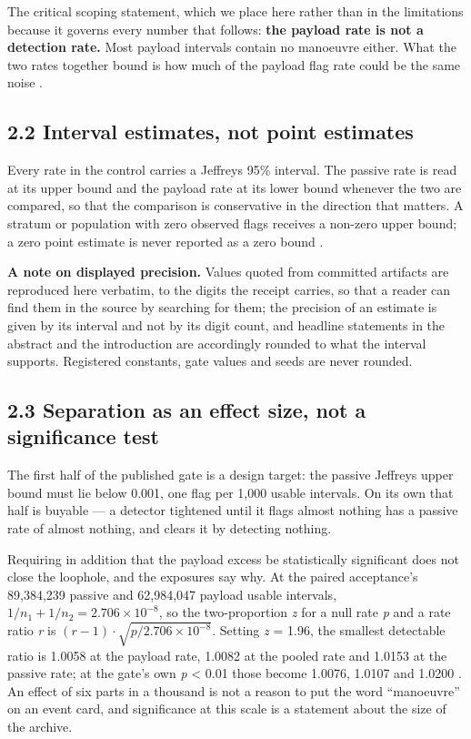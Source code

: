 \documentclass[11pt]{article}
\begin{document}
The critical scoping statement, which we place here rather than in the limitations because it governs every number that follows: \textbf{the payload rate is not a detection rate.} Most payload intervals contain no manoeuvre either. What the two rates together bound is how much of the payload flag rate could be the same noise%
.

\subsection*{2.2 Interval estimates, not point estimates}

Every rate in the control carries a Jeffreys 95\% interval. The passive rate is read at its upper bound and the payload rate at its lower bound whenever the two are compared, so that the comparison is conservative in the direction that matters. A stratum or population with zero observed flags receives a non-zero upper bound; a zero point estimate is never reported as a zero bound%
.

\textbf{A note on displayed precision.} Values quoted from committed artifacts are reproduced here verbatim, to the digits the receipt carries, so that a reader can find them in the source by searching for them; the precision of an estimate is given by its interval and not by its digit count, and headline statements in the abstract and the introduction are accordingly rounded to what the interval supports. Registered constants, gate values and seeds are never rounded.

\subsection*{2.3 Separation as an effect size, not a significance test}

The first half of the published gate is a design target: the passive Jeffreys upper bound must lie below 0.001, one flag per 1,000 usable intervals. On its own that half is buyable --- a detector tightened until it flags almost nothing has a passive rate of almost nothing, and clears it by detecting nothing.

Requiring in addition that the payload excess be statistically significant does not close the loophole, and the exposures say why. At the paired acceptance's 89,384,239 passive and 62,984,047 payload usable intervals, $1/n_1 + 1/n_2 = 2.706 \times 10^{-8}$, so the two-proportion \emph{z} for a null rate \emph{p} and a rate ratio \emph{r} is $(r - 1)\cdot\sqrt{p / 2.706 \times 10^{-8}}$. Setting \emph{z} = 1.96, the smallest detectable ratio is 1.0058 at the payload rate, 1.0082 at the pooled rate and 1.0153 at the passive rate; at the gate's own \emph{p} < 0.01 those become 1.0076, 1.0107 and 1.0200%
. An effect of six parts in a thousand is not a reason to put the word ``manoeuvre'' on an event card, and significance at this scale is a statement about the size of the archive.
\end{document}
